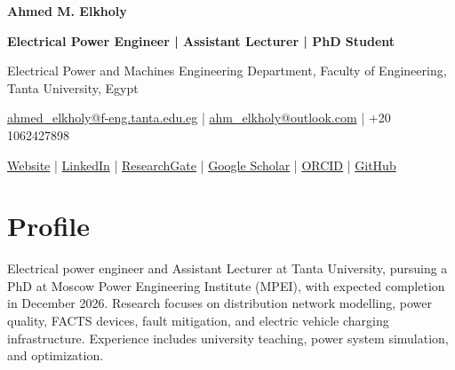 \documentclass[10pt,a4paper]{article}
\begin{document}
\raggedright

{\LARGE\bfseries\color{accent} Ahmed M. Elkholy}\par
\textbf{Electrical Power Engineer | Assistant Lecturer | PhD Student}\par
Electrical Power and Machines Engineering Department, Faculty of Engineering, Tanta University, Egypt\par
\href{mailto:ahmed\_elkholy@f-eng.tanta.edu.eg}{ahmed\_elkholy@f-eng.tanta.edu.eg} | \href{mailto:ahm\_elkholy@outlook.com}{ahm\_elkholy@outlook.com} | +20 1062427898\par
\href{https://ahmelkholy.github.io/}{Website} | \href{https://www.linkedin.com/in/ahmelkholy/}{LinkedIn} | \href{https://www.researchgate.net/profile/Ahmed-Elkholy-7}{ResearchGate} | \href{https://scholar.google.com/citations?user=KbZs8\_AAAAAJ\&hl=en}{Google Scholar} | \href{https://orcid.org/0000-0002-1834-1175}{ORCID} | \href{https://github.com/ahmelkholy}{GitHub}\par
\section*{Profile}
Electrical power engineer and Assistant Lecturer at Tanta University, pursuing a PhD at Moscow Power Engineering Institute (MPEI), with expected completion in December 2026. Research focuses on distribution network modelling, power quality, FACTS devices, fault mitigation, and electric vehicle charging infrastructure. Experience includes university teaching, power system simulation, and optimization.\par
\end{document}
